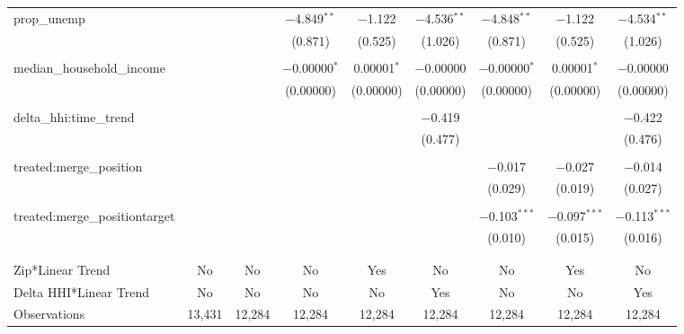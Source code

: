 \begin{table}[H]
{\begin{tabular}{@{\extracolsep{5pt}}lcccccccc}
  prop\_unemp &  &  & $-$4.849$^{**}$ & $-$1.122 & $-$4.536$^{**}$ & $-$4.848$^{**}$ & $-$1.122 & $-$4.534$^{**}$ \\  

   &  &  & (0.871) & (0.525) & (1.026) & (0.871) & (0.525) & (1.026) \\  

   & & & & & & & & \\  

  median\_household\_income &  &  & $-$0.00000$^{*}$ & 0.00001$^{*}$ & $-$0.00000 & $-$0.00000$^{*}$ & 0.00001$^{*}$ & $-$0.00000 \\  

   &  &  & (0.00000) & (0.00000) & (0.00000) & (0.00000) & (0.00000) & (0.00000) \\  

   & & & & & & & & \\  

  delta\_hhi:time\_trend &  &  &  &  & $-$0.419 &  &  & $-$0.422 \\  

   &  &  &  &  & (0.477) &  &  & (0.476) \\  

   & & & & & & & & \\  

  treated:merge\_position &  &  &  &  &  & $-$0.017 & $-$0.027 & $-$0.014 \\  

   &  &  &  &  &  & (0.029) & (0.019) & (0.027) \\  

   & & & & & & & & \\  

  treated:merge\_positiontarget &  &  &  &  &  & $-$0.103$^{***}$ & $-$0.097$^{***}$ & $-$0.113$^{***}$ \\  

   &  &  &  &  &  & (0.010) & (0.015) & (0.016) \\  

   & & & & & & & & \\  

 \hline \\[-1.8ex]  

 Zip*Linear Trend & No & No & No & Yes & No & No & Yes & No \\  

 Delta HHI*Linear Trend & No & No & No & No & Yes & No & No & Yes \\  

 Observations & 13,431 & 12,284 & 12,284 & 12,284 & 12,284 & 12,284 & 12,284 & 12,284 \\  


\end{tabular}}
\end{table}

